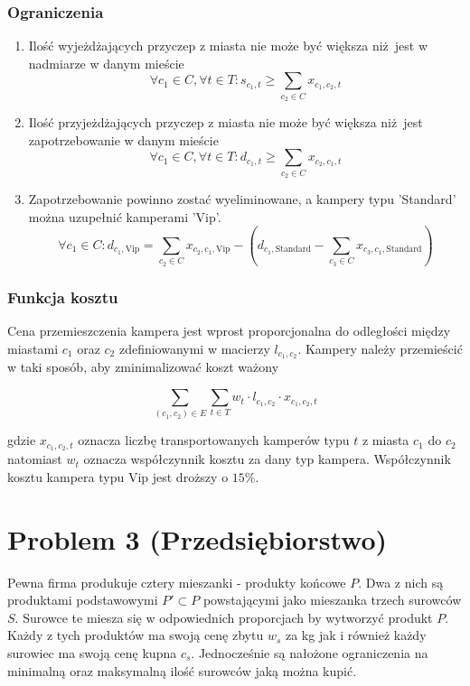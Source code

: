 \documentclass[a4paper,11pt]{article}
\theoremstyle{mytheor}
\begin{document}
\subsubsection*{Ograniczenia}
\begin{enumerate}
    \item Ilość wyjeżdżających przyczep z miasta nie może być większa niż jest w nadmiarze w danym mieście
    $$
        \forall c_1\in C, \forall t\in T: s_{c_1,t} \geq \sum_{c_2\in C} x_{c_1, c_2, t}
    $$
    \item Ilość przyjeżdżających przyczep z miasta nie może być większa niż jest zapotrzebowanie w danym mieście
    $$
        \forall c_1\in C, \forall t\in T: d_{c_1,t} \geq \sum_{c_2\in C} x_{c_2, c_1, t}
    $$
    \item Zapotrzebowanie powinno zostać wyeliminowane, a kampery typu 'Standard' można uzupełnić kamperami 'Vip'.
    $$
        \forall c_1\in C: d_{c_1, \text{Vip}} = \sum_{c_2\in C} x_{c_2,c_1,\text{Vip}} - (d_{c_1,\text{Standard}} - \sum_{c_3\in C} x_{c_3,c_1,\text{Standard}})
    $$
\end{enumerate}

\subsubsection*{Funkcja kosztu}
Cena przemieszczenia kampera jest wprost proporcjonalna do odległości między miastami $c_1$ oraz $c_2$ zdefiniowanymi w macierzy $l_{c_1,c_2}$. Kampery należy przemieścić w taki sposób, aby zminimalizować koszt ważony

$$
    \sum_{(c_1, c_2)\in E} \sum_{t\in T} w_{t} \cdot l_{c_1, c_2} \cdot x_{c_1, c_2, t}
$$

gdzie $x_{c_1, c_2, t}$ oznacza liczbę transportowanych kamperów typu $t$ z miasta $c_1$ do $c_2$ natomiast $w_t$ oznacza współczynnik kosztu za dany typ kampera. Współczynnik kosztu kampera typu Vip jest droższy o $15\%$.



\section*{Problem 3 (Przedsiębiorstwo)}
Pewna firma produkuje cztery mieszanki - produkty końcowe $P$. Dwa z nich są produktami podstawowymi $P'\subset P$ powstającymi jako mieszanka trzech surowców $S$.
Surowce te miesza się w odpowiednich proporcjach by wytworzyć produkt $P$. Każdy z tych produktów ma swoją cenę zbytu $w_s$ za kg jak i również każdy surowiec ma swoją cenę kupna $c_s$. Jednocześnie są nałożone ograniczenia na minimalną oraz maksymalną ilość surowców jaką można kupić.
\end{document}
